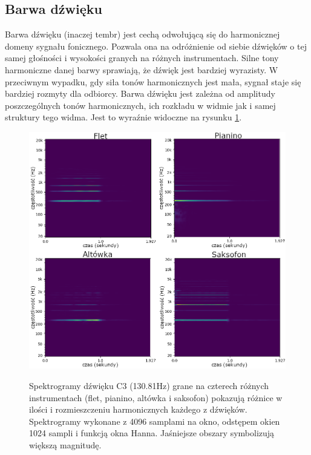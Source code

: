 \documentclass[12pt,a4paper,twoside]{mwart}
\begin{document}
\subsection{Barwa dźwięku}\label{sec:barwaDzwieku}
Barwa dźwięku (inaczej tembr) jest cechą odwołującą się do harmonicznej domeny sygnału fonicznego. Pozwala ona na odróżnienie od siebie dźwięków o tej samej głośności i wysokości granych na różnych instrumentach. Silne tony harmoniczne danej barwy sprawiają, że dźwięk jest bardziej wyrazisty. W przeciwnym wypadku, gdy siła tonów harmonicznych jest mała, sygnał staje się bardziej rozmyty dla odbiorcy. Barwa dźwięku jest zależna od amplitudy poszczególnych tonów harmonicznych, ich rozkładu w widmie jak i samej struktury tego widma. Jest to wyraźnie widoczne na rysunku \ref{fig:spektrogram}.

\begin{figure}[t]
  \begin{center}
  \includegraphics[scale=0.4]{images/spectogram_instruments.png}\\
  \caption{Spektrogramy dźwięku C3 (130.81Hz) grane na czterech różnych instrumentach (flet, pianino, altówka i saksofon) pokazują różnice w ilości i rozmieszczeniu harmonicznych każdego z dźwięków. Spektrogramy wykonane z 4096 samplami na okno, odstępem okien 1024 sampli i funkcją okna Hanna. Jaśniejsze obszary symbolizują większą magnitudę.}
  \label{fig:spektrogram}
  \end{center}
\end{figure}
\end{document}
